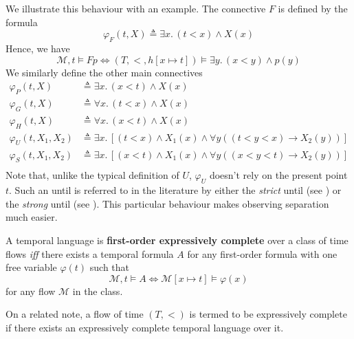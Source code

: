 \documentclass[a4paper,UKenglish,cleveref, autoref, thm-restate]{lipics-v2021}
\begin{document}
We illustrate this behaviour with an example. The connective $F$ is defined by the formula
\begin{equation*}
    \varphi_F(t, X) \triangleq \exists x.\, (t < x) \land X(x)
\end{equation*}
Hence, we have
\begin{equation*}
    \mathcal{M}, t \vDash F p \Longleftrightarrow (T, <, h[x \mapsto t]) \vDash \exists y.\, (x < y) \land p(y)
\end{equation*}
We similarly define the other main connectives
\begin{equation*}
    \begin{aligned}
        \varphi_P(t, X) &\triangleq \exists x.\, (x < t) \land X(x)\\
        \varphi_G(t, X) &\triangleq \forall x.\, (t < x) \land X(x)\\
        \varphi_H(t, X) &\triangleq \forall x.\, (x < t) \land X(x)\\
        \varphi_U(t, X_1, X_2) &\triangleq \exists x.\, \left[ \left( t < x \right) \land X_1(x) \land \forall y \left( \left( t < y < x \right) \to X_2(y) \right) \right]\\
        \varphi_S(t, X_1, X_2) &\triangleq \exists x.\, \left[ \left( x < t \right) \land X_1(x) \land \forall y \left( \left( x < y < t \right) \to X_2(y) \right) \right]\\
    \end{aligned}
\end{equation*}
Note that, unlike the typical definition of $U$, $\varphi_U$ doesn’t rely on the present point $t$. Such an until is referred to in the literature by either the \textit{strict} until (see \cite{gastinStrictUntil06}) or the \textit{strong} until (see \cite{BeCl16}). This particular behaviour makes observing separation much easier.

\begin{definition}
    \label{expressive-completeness-definition}
    A temporal language is \textbf{first-order expressively complete} over a class of time flows \textit{iff} there exists a temporal formula $A$ for any first-order formula with one free variable $\varphi(t)$ such that
\begin{equation*}
    \mathcal{M}, t \vDash A \Longleftrightarrow \mathcal{M}[x \mapsto t] \vDash \varphi(x)
\end{equation*}
    for any flow $\mathcal{M}$ in the class.
\end{definition}
On a related note, a flow of time $(T, <)$ is termed to be expressively complete if there exists an expressively complete temporal language over it.
\end{document}
